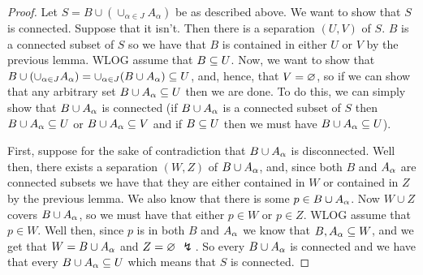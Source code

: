 \begin{proof}
Let $S= B\cup(\cup_{\alpha\in J}A_{\alpha})$ be as described above. We want to show that $S$ is connected. Suppose that it isn't. Then there is a separation $(U,V)$ of $S$. $B$ is a connected subset of $S$ so we have that $B$ is contained in either $U$ or $V$ by the previous lemma. WLOG assume that $B\subseteq U$. Now, we want to show that $B\cup(\cup_{\alpha\in J}A_{\alpha})= \cup_{\alpha\in J}(B\cup A_{\alpha})\subseteq U$, and, hence, that $V=\varnothing$, so if we can show that any arbitrary set $B\cup A_\alpha\subseteq U$ then we are done. To do this, we can simply show that $B\cup A_\alpha$ is connected (if $B\cup A_\alpha$ is a connected subset of $S$ then $B\cup A_\alpha\subseteq U$ or $B\cup A_\alpha\subseteq V$ and if $B\subseteq U$ then we must have $B\cup A_\alpha\subseteq U$). 

First, suppose for the sake of contradiction that $B\cup A_\alpha$ is disconnected. Well then, there exists a separation $(W,Z)$ of $B\cup A_\alpha$, and, since both $B$ and $A_\alpha$ are connected subsets we have that they are either contained in $W$ or contained in $Z$ by the previous lemma. We also know that there is some $p\in B\cup A_\alpha$. Now $W\cup Z$ covers $B\cup A_\alpha$, so we must have that either $p\in W$ or $p\in Z$. WLOG assume that $p\in W$. Well then, since $p$ is in both $B$ and $A_\alpha$ we know that $B,A_\alpha\subseteq W$, and we get that $W = B\cup A_\alpha$ and $Z= \varnothing$ $\lightning$. So every $B\cup A_\alpha$ is connected and we have that every $B\cup A_\alpha\subseteq U$ which means that $S$ is connected.

\end{proof}











